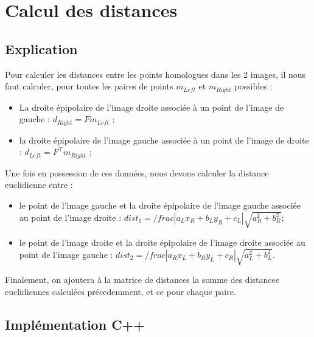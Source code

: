 \documentclass[a4paper]{article}
\begin{document}
\section{Calcul des distances}

\subsection{Explication}

Pour calculer les distances entre les points homologues dans les 2 images, il nous faut calculer, pour toutes les paires de points $m_{Left}$ et $m_{Right}$ possibles :
\begin{itemize}
  \item La droite épipolaire de l'image droite associée à un point de l'image de gauche : $d_{Right} = Fm_{Left}$ ;
  \item la droite épipolaire de l'image gauche associée à un point de l'image de droite : $d_{Left} = F^\top m_{Right}$ ;
\end{itemize}

Une fois en possession de ces données, nous devons calculer la distance euclidienne entre :
\begin{itemize}
  \item le point de l'image gauche et la droite épipolaire de l'image gauche associée au point de l'image droite : $dist_1 = /frac{|a_Lx_R + b_Ly_R + c_L|}{\sqrt{a_R^2 + b_R^2}}$;
  \item le point de l'image droite et la droite épipolaire de l'image droite associée au point de l'image gauche : $dist_2 = /frac{|a_Rx_L + b_Ry_L + c_R|}{\sqrt{a_L^2 + b_L^2}}$.
\end{itemize}

Finalement, on ajoutera à la matrice de distances la somme des distances euclidiennes calculées précedemment, et ce pour chaque paire.

\subsection{Implémentation C++}
\end{document}
